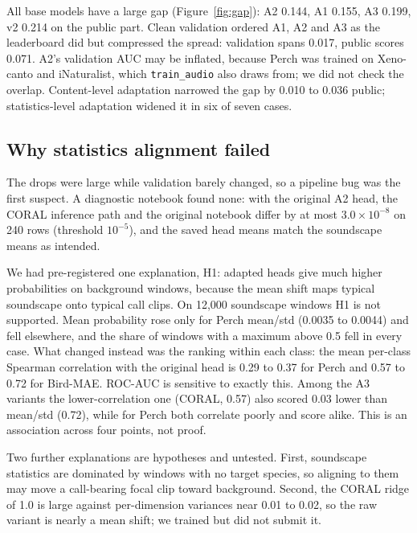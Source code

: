 \documentclass[letterpaper]{article} %
\begin{document}
All base models have a large gap (Figure~\ref{fig:gap}): A2 0.144, A1 0.155, A3 0.199, v2 0.214 on the public part. Clean validation ordered A1, A2 and A3 as the leaderboard did but compressed the spread: validation spans 0.017, public scores 0.071. A2's validation AUC may be inflated, because Perch was trained on Xeno-canto and iNaturalist, which \texttt{train\_audio} also draws from; we did not check the overlap. Content-level adaptation narrowed the gap by 0.010 to 0.036 public; statistics-level adaptation widened it in six of seven cases.

\subsection{Why statistics alignment failed}
The drops were large while validation barely changed, so a pipeline bug was the first suspect. A diagnostic notebook found none: with the original A2 head, the CORAL inference path and the original notebook differ by at most $3.0\times10^{-8}$ on 240 rows (threshold $10^{-5}$), and the saved head means match the soundscape means as intended.

We had pre-registered one explanation, H1: adapted heads give much higher probabilities on background windows, because the mean shift maps typical soundscape onto typical call clips. On 12,000 soundscape windows H1 is not supported. Mean probability rose only for Perch mean/std (0.0035 to 0.0044) and fell elsewhere, and the share of windows with a maximum above 0.5 fell in every case. What changed instead was the ranking within each class: the mean per-class Spearman correlation with the original head is 0.29 to 0.37 for Perch and 0.57 to 0.72 for Bird-MAE. ROC-AUC is sensitive to exactly this. Among the A3 variants the lower-correlation one (CORAL, 0.57) also scored 0.03 lower than mean/std (0.72), while for Perch both correlate poorly and score alike. This is an association across four points, not proof.

Two further explanations are hypotheses and untested. First, soundscape statistics are dominated by windows with no target species, so aligning to them may move a call-bearing focal clip toward background. Second, the CORAL ridge of 1.0 is large against per-dimension variances near 0.01 to 0.02, so the raw variant is nearly a mean shift; we trained but did not submit it.
\end{document}
